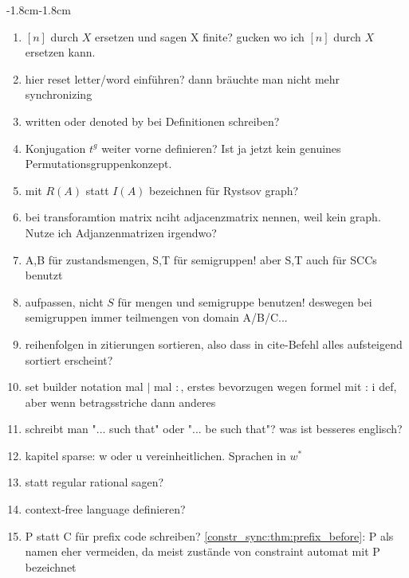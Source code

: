 \begin{adjustwidth}{-1.8cm}{-1.8cm}
\begin{enumerate}[itemsep=-5pt]
		\item $[n]$ durch $X$ ersetzen und sagen X finite? gucken wo ich $[n]$ durch $X$ ersetzen kann.
		
		\item hier reset letter/word einführen? dann bräuchte man nicht mehr synchronizing 
		
		\item written oder denoted by bei Definitionen schreiben?
		
		\item Konjugation $t^g$ weiter vorne definieren? Ist ja jetzt kein genuines Permutationsgruppenkonzept.
		
		\item mit $R(A)$ statt $I(A)$ bezeichnen für Rystsov graph?	
		
		\item bei transforamtion matrix nciht adjacenzmatrix nennen, weil kein graph. Nutze ich Adjanzenmatrizen irgendwo?
		
		\item A,B für zustandsmengen, S,T für semigruppen! aber S,T auch für SCCs benutzt
		
		\item aufpassen, nicht $S$ für mengen und semigruppe benutzen! deswegen bei semigruppen immer teilmengen von domain A/B/C...
		
		\item reihenfolgen in zitierungen sortieren, also dass in cite-Befehl alles aufsteigend sortiert erscheint?
		
		\item set builder notation mal $\mid$ mal $:$, erstes bevorzugen wegen formel mit : i def, aber wenn betragsstriche dann anderes
		
		\item schreibt man "... such that" oder "... be such that"? was ist besseres englisch?
		
		\item kapitel sparse: w oder u vereinheitlichen. Sprachen in $w^*$
		
		\item statt regular rational sagen?	 
		
		\item context-free language definieren?	 
		
		\item P statt C für prefix code schreiben? \cref{constr_sync:thm:prefix_before}: P als namen eher vermeiden, da meist zustände von constraint automat mit P bezeichnet
		

\end{enumerate}
\end{adjustwidth}
